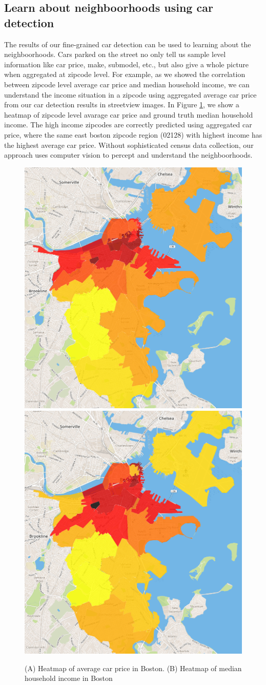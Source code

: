 \documentclass[10pt,twocolumn,letterpaper]{article}
\begin{document}
\subsection{Learn about neighboorhoods using car detection}
The results of our fine-grained car detection can be used to learning about the neighboorhoods. Cars parked on the street no only tell us sample level information like car price, make, submodel, etc., but also give a whole picture when aggregated at zipcode level. For example, as we showed the correlation between zipcode level average car price and median household income, we can understand the income situation in a zipcode using aggregated average car price from our car detection results in streetview images. In Figure \ref{fig:bosvis}, we show a heatmap of zipcode level avarage car price and ground truth median household income. The high income zipcodes are correctly predicted using aggregated car price, where the same east boston zipcode region (02128) with highest income has the highest average car price. Without sophisticated census data collection, our approach uses computer vision to percept and understand the neighboorhoods.

\begin{figure}[t]
\begin{center}

    \includegraphics[width=0.45\linewidth]{img/price.png}
    \includegraphics[width=0.45\linewidth]{img/income.png}
\end{center}
   \caption {(A) Heatmap of average car price in Boston. (B) Heatmap of median household income in Boston}
\label{fig:bosvis}
\end{figure}
\end{document}
